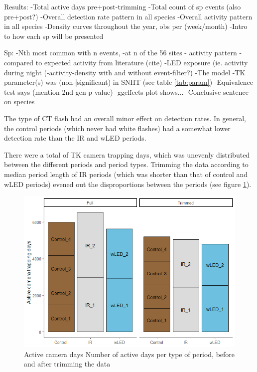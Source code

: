 Results:
	-Total active days pre+post-trimming
	-Total count of sp events (also pre+post?)
-Overall detection rate pattern in all species
-Overall activity pattern in all species
-Density curves throughout the year, obs per (week/month)
-Intro to how each sp will be presented

Sp:
-Nth most common with n events,
	-at n of the 56 sites 
- activity pattern
	-compared to expected activity from literature (cite)
	-LED exposure (ie. activity during night
	(-activity-density with and without event-filter?)
-The model
	-TK parameter(s) was (non-|significant) in SNHT (see table \ref{tab:param})
	-Equivalence test says (mention 2nd gen p-value)
	-ggeffects plot shows...
-Conclusive sentence on species





The type of CT flash had an overall minor effect on detection rates.
In general, the control periods (which never had white flashes) had a somewhat lower detection rate than the IR and wLED periods.

There were a total of TK camera trapping days, which was unevenly distributed between the different periods and period types. Trimming the data according to median period length of IR periods (which was shorter than that of control and wLED periods) evened out the disproportions between the periods (see figure \ref{fig:active days}).

\begin{figure}
 \centering
	\includegraphics[scale=.9]{../R/glmm_sp_files/figure-html/active-days-3.png}
 \caption[Active camera days]
 {Active camera days %
 Number of active days per type of period, before and after trimming the data}
 \label{fig:active days}
\end{figure}


